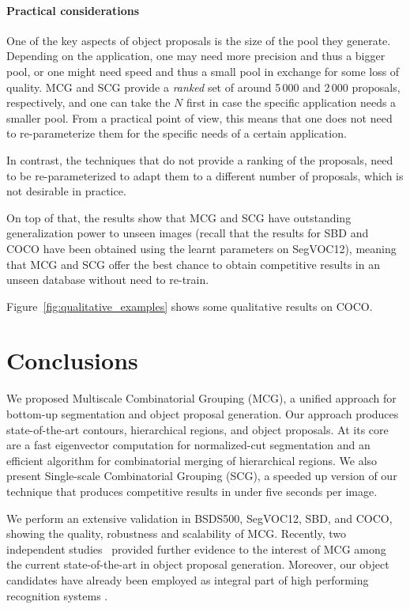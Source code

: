 \documentclass[10pt,journal,cspaper,compsoc]{IEEEtran}
\begin{document}
\paragraph*{\textbf{Practical considerations}}
One of the key aspects of object proposals is the size of the pool they generate. 
Depending on the application, one may need more precision and thus a bigger pool,
or one might need speed and thus a small pool in exchange for some loss of quality.
MCG and SCG provide a \textit{ranked} set of around
5\,000 and 2\,000 proposals, respectively, and one can take the $N$ first
in case the specific application needs a smaller pool.
From a practical point of view, this means that one does not need to re-parameterize them for the specific
needs of a certain application.

In contrast, the techniques that do not provide a ranking of the proposals,
need to be re-parameterized to adapt them to a different number of proposals, which 
is not desirable in practice.

On top of that, the results show that MCG and SCG have outstanding generalization power to unseen images
(recall that the results for SBD and COCO have been obtained using the learnt parameters on SegVOC12),
meaning that MCG and SCG offer the best chance to obtain competitive results in an unseen database without need to re-train.

Figure~\ref{fig:qualitative_examples} shows some qualitative results on COCO.

\section{Conclusions}
\label{sec:conclu}
We proposed Multiscale Combinatorial Grouping (MCG), a unified approach for bottom-up segmentation and
object proposal generation.
Our approach produces state-of-the-art contours, hierarchical regions, and object proposals. 
At its core are a fast eigenvector computation for normalized-cut segmentation and an efficient algorithm for combinatorial merging of hierarchical regions.
We also present Single-scale Combinatorial Grouping (SCG), a speeded up version of our technique that produces competitive results in under five seconds per image. 

We perform an extensive validation in BSDS500, SegVOC12, SBD, and COCO, showing the quality, robustness and scalability of MCG.
Recently, two independent studies~\cite{schiele:bmvc14, Hosang2015} provided further evidence to the interest of MCG among the current state-of-the-art in object proposal generation. 
Moreover, our object candidates have already been employed as integral part of high performing recognition systems \cite{BharathECCV2014}.
\end{document}
